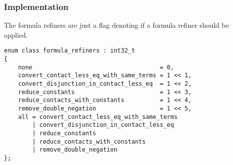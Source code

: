 \documentclass{article}
\begin{document}
		\subsubsection*{Implementation}
			The formula refiners are just a flag denoting if a formula refiner should be applied.
			\begin{lstlisting}
enum class formula_refiners : int32_t
{
    none                                    = 0,
    convert_contact_less_eq_with_same_terms = 1 << 1,
    convert_disjunction_in_contact_less_eq  = 1 << 2,
    reduce_constants                        = 1 << 3,
    reduce_contacts_with_constants          = 1 << 4,
    remove_double_negation                  = 1 << 5,
    all = convert_contact_less_eq_with_same_terms
        | convert_disjunction_in_contact_less_eq 
        | reduce_constants 
        | reduce_contacts_with_constants 
        | remove_double_negation
};
			\end{lstlisting}

\end{document}
